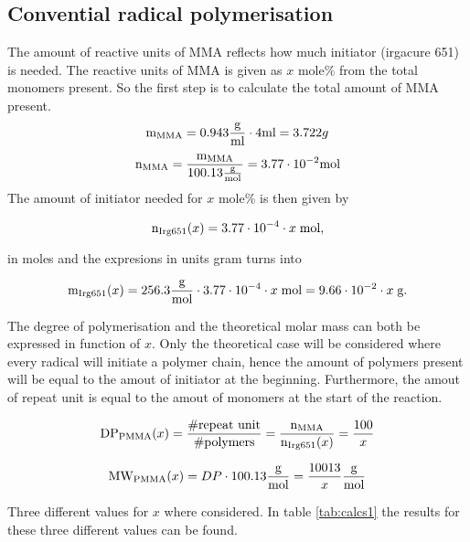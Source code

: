 \subsection{Convential radical polymerisation}

    The amount of reactive units of MMA reflects how much initiator (irgacure 651) is needed.
    The reactive units of MMA is given as $x$ mole\% from the total monomers present. So the first step
    is to calculate the total amount of MMA present.
    $$\mathtext[MMA]{m} = 0.943\density\cdot 4 \ml = 3.722 g$$
    $$\mathtext[MMA]{n} = \frac{\mathtext[MMA]{m}}{100.13\MW} = 3.77 \cdot 10^{-2} \mole$$
    The amount of initiator needed for $x$ mole\% is then given by

    \begin{equation}
        \mathtext[Irg651]{n}(x) = 3.77\cdot10^{-4}\cdot x \;\mole,
        \label{eq:molepercent}
    \end{equation}

    in moles and the expresions in units gram turns into

    \begin{equation}
        \mathtext[Irg651]{m}(x) = 256.3\MW\cdot3.77\cdot10^{-4}\cdot x \;\mole = 9.66\cdot10^{-2}\cdot x \;\g.
        \label{eq:molepercent_grams}
    \end{equation}

    The degree of polymerisation and the theoretical molar mass can both be expressed in function of $x$. Only the theoretical
    case will be considered where every radical will initiate a polymer chain, hence the amount of polymers present will be equal 
    to the amout of initiator at the beginning. Furthermore, the amout of repeat unit is equal to the amout of monomers at the start
    of the reaction.

    \begin{equation}
        \mathtext[PMMA]{DP}(x) = \frac{\# \text{repeat unit}}{\# \text{polymers}} = \frac{\mathtext[MMA]{n}}{\mathtext[Irg651]{n}(x)} = \frac{100}{x} \\
        \label{eq:DPx}
    \end{equation}

    \begin{equation}
        \mathtext[PMMA]{MW}(x) = DP\cdot 100.13\MW = \frac{10013}{x} \MW
        \label{eq:MWx}
    \end{equation}

    Three different values for $x$ where considered. In table \ref{tab:calcs1} the results for these three 
    different values can be found.

